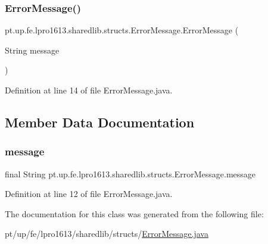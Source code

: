 \subsubsection{\texorpdfstring{Error\+Message()}{ErrorMessage()}}
{\footnotesize\ttfamily pt.\+up.\+fe.\+lpro1613.\+sharedlib.\+structs.\+Error\+Message.\+Error\+Message (\begin{DoxyParamCaption}\item[{String}]{message }\end{DoxyParamCaption})}



Definition at line 14 of file Error\+Message.\+java.



\subsection{Member Data Documentation}
\hypertarget{classpt_1_1up_1_1fe_1_1lpro1613_1_1sharedlib_1_1structs_1_1_error_message_ad30e3949895b468c79beb5aacd6f6150}{}\label{classpt_1_1up_1_1fe_1_1lpro1613_1_1sharedlib_1_1structs_1_1_error_message_ad30e3949895b468c79beb5aacd6f6150} 
\subsubsection{\texorpdfstring{message}{message}}
{\footnotesize\ttfamily final String pt.\+up.\+fe.\+lpro1613.\+sharedlib.\+structs.\+Error\+Message.\+message}



Definition at line 12 of file Error\+Message.\+java.



The documentation for this class was generated from the following file\+:\begin{DoxyCompactItemize}
\item 
pt/up/fe/lpro1613/sharedlib/structs/\hyperlink{_error_message_8java}{Error\+Message.\+java}\end{DoxyCompactItemize}
